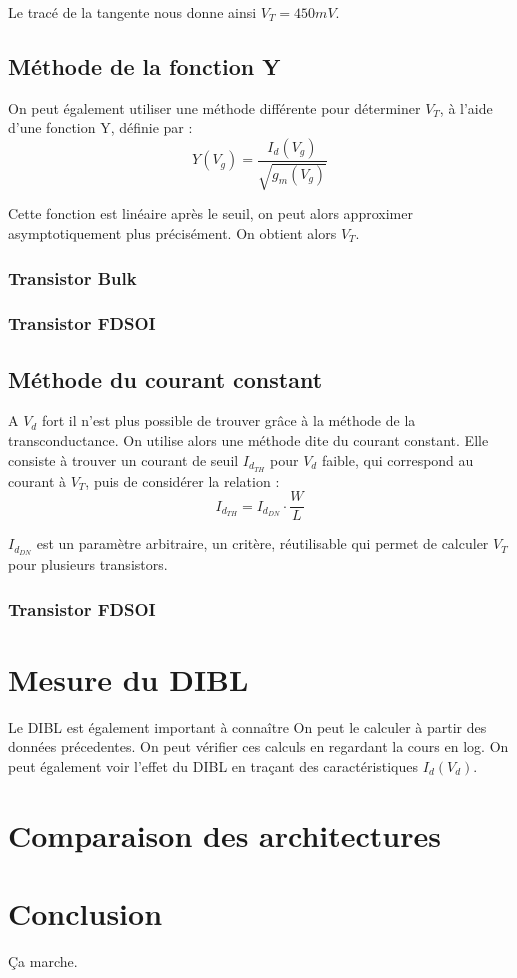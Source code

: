 \documentclass[a4paper,11pt]{report}
\begin{document}
Le tracé de la tangente nous donne ainsi $V_T=450mV$.

\section{Méthode de la fonction Y}
On peut également utiliser une méthode différente pour déterminer $V_T$, à l'aide d'une fonction Y, définie par :
\[Y(V_g)=\dfrac{I_d(V_g)}{\sqrt{g_m(V_g)}}\]

Cette fonction est linéaire après le seuil, on peut alors approximer asymptotiquement plus précisément. On obtient alors $V_T$.
\subsection{Transistor Bulk}
\subsection{Transistor FDSOI}
\section{Méthode du courant constant}
A $V_d$ fort il n'est plus possible de trouver grâce à la méthode de la transconductance. On utilise alors une méthode dite du courant constant. Elle consiste à trouver un courant de seuil $I_{d_{TH}}$ pour $V_d$ faible, qui correspond au courant à $V_T$, puis de considérer la relation : \[I_{d_{TH}}=I_{d_{DN}}\cdot\dfrac{W}{L}\]

$I_{d_{DN}}$ est un paramètre arbitraire, un critère, réutilisable qui permet de calculer $V_T$ pour plusieurs transistors.

\subsection{Transistor FDSOI}


\chapter{Mesure du DIBL}
Le DIBL est également important à connaître %
On peut le calculer à partir des données précedentes.
On peut vérifier ces calculs en regardant la cours en log.
On peut également voir l'effet du DIBL en traçant des caractéristiques $I_d(V_d)$.

\chapter{Comparaison des architectures}

\chapter*{Conclusion}

Ça marche. %
\end{document}
